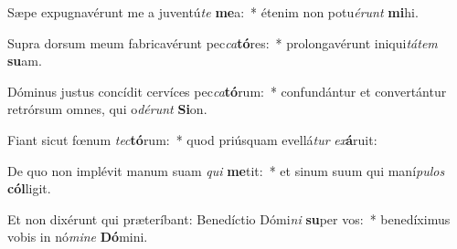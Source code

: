 \item Sæpe expugnavérunt me a juventú\textit{te} \textbf{me}a:~* étenim non potu\textit{é}\textit{runt} \textbf{mi}hi.
\item Supra dorsum meum fabricavérunt pec\textit{ca}\textbf{tó}res:~* prolongavérunt iniqui\textit{tá}\textit{tem} \textbf{su}am.
\item Dóminus justus concídit cervíces pec\textit{ca}\textbf{tó}rum:~* confundántur et convertántur retrórsum omnes, qui o\textit{dé}\textit{runt} \textbf{Si}on.
\item Fiant sicut fœnum \textit{tec}\textbf{tó}rum:~* quod priúsquam evellá\textit{tur} \textit{ex}\textbf{á}ruit:
\item De quo non implévit manum suam \textit{qui} \textbf{me}tit:~* et sinum suum qui maní\textit{pu}\textit{los} \textbf{cól}ligit.
\item Et non dixérunt qui præteríbant: Benedíctio Dómi\textit{ni} \textbf{su}per vos:~* benedíximus vobis in nó\textit{mi}\textit{ne} \textbf{Dó}mini.

